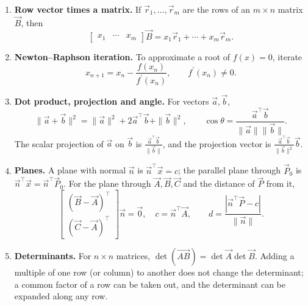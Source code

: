 \begin{enumerate}[label=\normalfont 1.1.\arabic*.,ref=1.1.\arabic*]
\setlength{\itemsep}{0.35em}
\item \label{formula-1-1-1} \textbf{Row vector times a matrix.} If $\vec{r}_1,\ldots,\vec{r}_m$ are the rows of an $m\times n$ matrix $\vec{B}$, then
\begin{equation*}\tag{1.1.1.1}
\begin{bmatrix}x_1&\cdots&x_m\end{bmatrix}\vec{B}=x_1\vec{r}_1+\cdots+x_m\vec{r}_m.
\end{equation*}
\item \label{formula-1-1-2} \textbf{Newton--Raphson iteration.} To approximate a root of $f(x)=0$, iterate
\begin{equation*}\tag{1.1.2.1}
x_{n+1}=x_n-\frac{f(x_n)}{f^{\prime}(x_n)},\qquad f^{\prime}(x_n)\ne0.
\end{equation*}
\item \label{formula-1-1-3} \textbf{Dot product, projection and angle.} For vectors $\vec{a},\vec{b}$,
\begin{equation*}\tag{1.1.3.1}
\|\vec{a}+\vec{b}\|^2=\|\vec{a}\|^2+2\vec{a}^{\top}\vec{b}+\|\vec{b}\|^2,\qquad
\cos\theta=\frac{\vec{a}^{\top}\vec{b}}{\|\vec{a}\|\|\vec{b}\|}.
\end{equation*}
The scalar projection of $\vec{a}$ on $\vec{b}$ is $\frac{\vec{a}^{\top}\vec{b}}{\|\vec{b}\|}$, and the projection vector is $\frac{\vec{a}^{\top}\vec{b}}{\|\vec{b}\|^2}\vec{b}$.
\item \label{formula-1-1-4} \textbf{Planes.} A plane with normal $\vec{n}$ is $\vec{n}^{\top}\vec{x}=c$; the parallel plane through $\vec{P}_0$ is $\vec{n}^{\top}\vec{x}=\vec{n}^{\top}\vec{P}_0$. For the plane through $\vec{A},\vec{B},\vec{C}$ and the distance of $\vec{P}$ from it,
\begin{equation*}\tag{1.1.4.1}
\begin{bmatrix}(\vec{B}-\vec{A})^{\top}\\(\vec{C}-\vec{A})^{\top}\end{bmatrix}\vec{n}=\vec{0},\quad c=\vec{n}^{\top}\vec{A},\qquad
d=\frac{|\vec{n}^{\top}\vec{P}-c|}{\|\vec{n}\|}.
\end{equation*}
\item \label{formula-1-1-5} \textbf{Determinants.} For $n\times n$ matrices, $\det(\vec{AB})=\det\vec{A}\det\vec{B}$. Adding a multiple of one row (or column) to another does not change the determinant; a common factor of a row can be taken out, and the determinant can be expanded along any row.

\end{enumerate}
